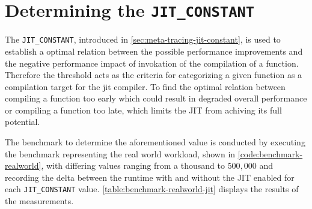 \section{Determining the \texttt{JIT\_CONSTANT}}
\label{sec:jit-constant-discussion}

The \texttt{JIT\_CONSTANT}, introduced in
\autoref{sec:meta-tracing-jit-constant}, is used to establish a optimal
relation between the possible performance improvements and the negative
performance impact of invokation of the compilation of a function. Therefore
the threshold acts as the criteria for categorizing a given function as a
compilation target for the jit compiler. To find the optimal relation between
compiling a function too early which could result in degraded overall
performance or compiling a function too late, which limits the JIT from
achiving its full potential.

The benchmark to determine the aforementioned value is conducted by executing
the benchmark representing the real world workload, shown in
\autoref{code:benchmark-realworld}, with differing values ranging from a
thousand to $500,000$ and recording the delta between the runtime with and
without the JIT enabled for each \texttt{JIT\_CONSTANT} value.
\autoref{table:benchmark-realworld-jit} displays the results of the
measurements.

